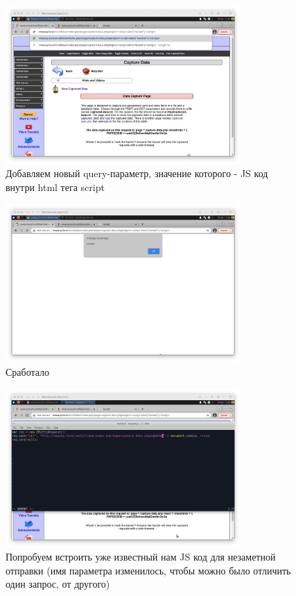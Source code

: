 \documentclass[a4paper]{article}
\begin{document}
  \begin{figure}[H]
    \centering
    \includegraphics[width=0.8\textwidth]{step_00021}
    \caption{Добавляем новый query-параметр, значение которого - JS код внутри html тега script}
  \end{figure}

  \begin{figure}[H]
    \centering
    \includegraphics[width=0.8\textwidth]{step_00022}
    \caption{Сработало}
  \end{figure}

  \begin{figure}[H]
    \centering
    \includegraphics[width=0.8\textwidth]{step_00023}
    \caption{Попробуем встроить уже известный нам JS код для незаметной отправки (имя параметра изменилось, чтобы можно было отличить один запрос, от другого)}
  \end{figure}
\end{document}
